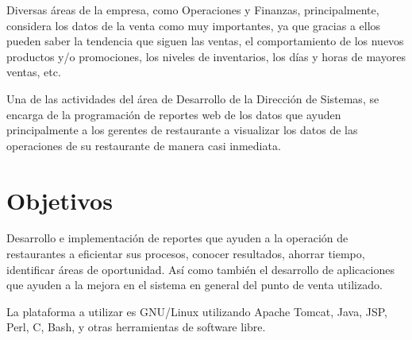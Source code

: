 Diversas áreas de la empresa, como Operaciones y Finanzas, principalmente, considera los datos de la venta como muy importantes, ya que gracias a ellos pueden saber la tendencia que siguen las ventas, el comportamiento de los nuevos productos y/o promociones, los niveles de inventarios, los días y horas de mayores ventas, etc. 

Una de las actividades del área de Desarrollo de la Dirección de Sistemas, se encarga de la programación de reportes web de los datos que ayuden principalmente a los gerentes de restaurante a visualizar los datos de las operaciones de su restaurante de manera casi inmediata.

\section{Objetivos}
\label{sec:objetivosss}

Desarrollo e implementación de reportes que ayuden a la operación de restaurantes a eficientar sus procesos, conocer resultados, ahorrar tiempo, identificar áreas de oportunidad. Así como también el desarrollo de aplicaciones que ayuden a la mejora en el sistema en general del punto de venta utilizado.

La plataforma a utilizar es GNU/Linux utilizando Apache Tomcat, Java, JSP, Perl, C, Bash, y otras herramientas de software libre.